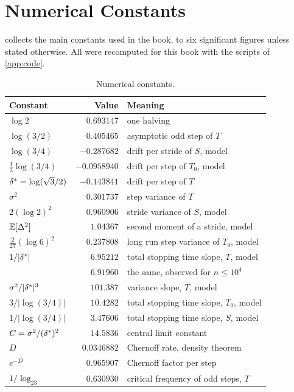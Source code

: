 \chapter{Numerical Constants}\label{app:constants}

 collects the main constants used in the book, to
six significant figures unless stated otherwise. All were recomputed for this
book with the scripts of \cref{app:code}.

\begin{table}[ht]
\centering\small\setlength{\tabcolsep}{4pt}
\caption{Numerical constants.}
\label{tab:appA:constants}
\begin{tabular}{@{}lrl@{}}
\toprule
Constant & Value & Meaning \\
\midrule
$\log 2$ & $0.693147$ & one halving \\
$\log(3/2)$ & $0.405465$ & asymptotic odd step of $T$ \\
$\log(3/4)$ & $-0.287682$ & drift per stride of $S$, model \\
$\tfrac13\log(3/4)$ & $-0.0958940$ & drift per step of $T_0$, model \\
$\delta^{*}=\log(\sqrt3/2)$ & $-0.143841$ & drift per step of $T$ \\
$\sigma^2$ & $0.301737$ & step variance of $T$ \\
$2(\log2)^2$ & $0.960906$ & stride variance of $S$, model \\
$\mathbb{E}[\Delta^2]$ & $1.04367$ & second moment of a stride, model \\
$\tfrac2{27}(\log6)^2$ & $0.237808$ & long run step variance of $T_0$, model \\
$1/|\delta^{*}|$ & $6.95212$ & total stopping time slope, $T$, model \\
 & $6.91960$ & the same, observed for $n\le10^4$ \\
$\sigma^2/|\delta^{*}|^3$ & $101.387$ & variance slope, $T$, model \\
$3/|\log(3/4)|$ & $10.4282$ & total stopping time slope, $T_0$, model \\
$1/|\log(3/4)|$ & $3.47606$ & total stopping time slope, $S$, model \\
$C=\sigma^2/(\delta^{*})^{2}$ & $14.5836$ & central limit constant \\
$D$ & $0.0346882$ & Chernoff rate, density theorem \\
$e^{-D}$ & $0.965907$ & Chernoff factor per step \\
$1/\log_23$ & $0.630930$ & critical frequency of odd steps, $T$ \\

\end{tabular}
\end{table}
